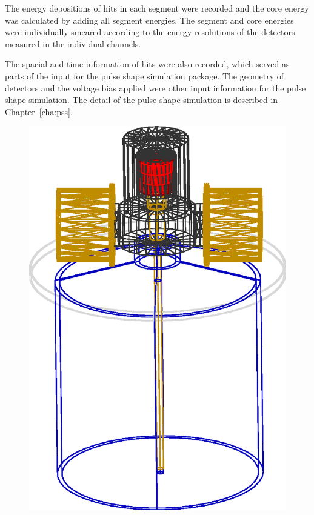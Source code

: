 The energy depositions of hits in each segment were recorded and the core energy was calculated by adding all segment energies. The segment and core energies were individually smeared according to the energy resolutions of the detectors measured in the individual channels.

The spacial and time information of hits were also recorded, which served as parts of the input for the pulse shape simulation package. The geometry of detectors and the voltage bias applied were other input information for the pulse shape simulation. The detail of the pulse shape simulation is described in Chapter~\ref{cha:pss}.
 
\begin{figure}[tbhp]
  \centering
  \includegraphics[height=0.3\textheight,clip]{SIwired}\hfil

\end{figure}
